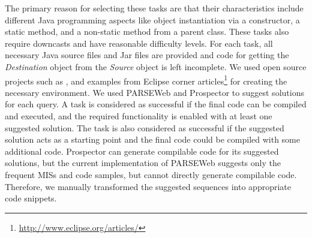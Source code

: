 \documentclass{fp035-thummalapenta}
\begin{document}
The primary reason for selecting these tasks are that their
characteristics include different Java programming aspects like
object instantiation via a constructor, a static method, and a
non-static method from a parent class. These tasks also require
downcasts and have reasonable difficulty levels. For each task, all
necessary Java source files and Jar files are provided and code for
getting the \emph{Destination} object from the \emph{Source} object
is left incomplete. We used open source projects such as
, and examples from Eclipse corner
articles\footnote{\url{http://www.eclipse.org/articles/}} for
creating the necessary environment. We used PARSEWeb and Prospector
to suggest solutions for each query. A task is considered as
successful if the final code can be compiled and executed, and the
required functionality is enabled with at least one suggested
solution. The task is also considered as successful if the suggested
solution acts as a starting point and the final code could be
compiled with some additional code. Prospector can generate
compilable code for its suggested solutions, but the current
implementation of PARSEWeb suggests only the frequent MISs and code
samples, but cannot directly generate compilable code. Therefore, we
manually transformed the suggested sequences into appropriate code
snippets.
\setlength{\tabcolsep}{3pt}
\end{document}
